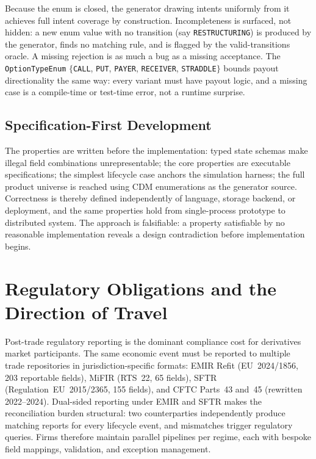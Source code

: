 \documentclass[11pt,a4paper]{article}
\begin{document}
Because the enum is closed, the generator drawing intents uniformly from it achieves full intent coverage by construction. Incompleteness is surfaced, not hidden: a new enum value with no transition (say \texttt{RESTRUCTURING}) is produced by the generator, finds no matching rule, and is flagged by the valid-transitions oracle. A missing rejection is as much a bug as a missing acceptance. The \texttt{OptionTypeEnum} $\{$\texttt{CALL}, \texttt{PUT}, \texttt{PAYER}, \texttt{RECEIVER}, \texttt{STRADDLE}$\}$ bounds payout directionality the same way: every variant must have payout logic, and a missing case is a compile-time or test-time error, not a runtime surprise.

\subsection{Specification-First Development}
\label{sec:invariants-specfirst}

The properties are written before the implementation: typed state schemas make illegal field combinations unrepresentable; the core properties are executable specifications; the simplest lifecycle case anchors the simulation harness; the full product universe is reached using CDM enumerations as the generator source. Correctness is thereby defined independently of language, storage backend, or deployment, and the same properties hold from single-process prototype to distributed system. The approach is falsifiable: a property satisfiable by no reasonable implementation reveals a design contradiction before implementation begins.


\section{Regulatory Obligations and the Direction of Travel}
\label{sec:regulatory}

Post-trade regulatory reporting is the dominant compliance cost for derivatives market participants. The same economic event must be reported to multiple trade repositories in jurisdiction-specific formats: EMIR Refit (EU~2024/1856, 203 reportable fields), MiFIR (RTS~22, 65 fields), SFTR (Regulation~EU~2015/2365, 155 fields), and CFTC Parts~43 and~45 (rewritten 2022--2024). Dual-sided reporting under EMIR and SFTR makes the reconciliation burden structural: two counterparties independently produce matching reports for every lifecycle event, and mismatches trigger regulatory queries. Firms therefore maintain parallel pipelines per regime, each with bespoke field mappings, validation, and exception management.
\end{document}
